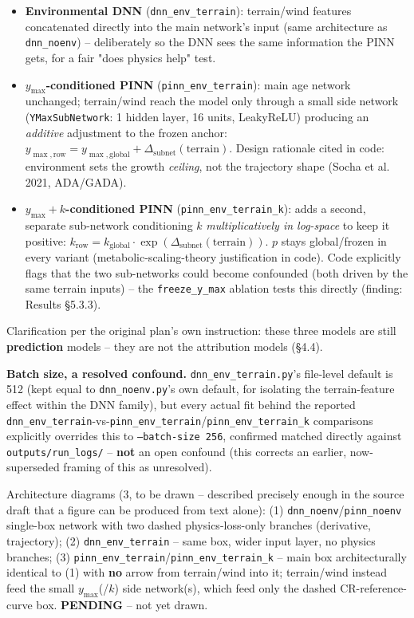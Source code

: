 \begin{itemize}
\setlength\itemsep{0pt}
\item \textbf{Environmental DNN} (\texttt{dnn\_env\_terrain}): terrain/wind features concatenated
directly into the main network's input (same architecture as \texttt{dnn\_noenv}) -- deliberately
so the DNN sees the same information the PINN gets, for a fair "does physics help" test.
\item \textbf{$y_{\max}$-conditioned PINN} (\texttt{pinn\_env\_terrain}): main age network
unchanged; terrain/wind reach the model only through a small side network (\texttt{YMaxSubNetwork}:
1 hidden layer, 16 units, LeakyReLU) producing an \emph{additive} adjustment to the frozen anchor:
$y_{\max,\text{row}} = y_{\max,\text{global}} + \Delta_{\text{subnet}}(\text{terrain})$. Design
rationale cited in code: environment sets the growth \emph{ceiling}, not the trajectory shape
(Socha et al. 2021, ADA/GADA).
\item \textbf{$y_{\max}+k$-conditioned PINN} (\texttt{pinn\_env\_terrain\_k}): adds a second,
separate sub-network conditioning $k$ \emph{multiplicatively in log-space} to keep it positive:
$k_{\text{row}} = k_{\text{global}}\cdot \exp(\Delta_{\text{subnet}}(\text{terrain}))$. $p$ stays
global/frozen in every variant (metabolic-scaling-theory justification in code). Code explicitly
flags that the two sub-networks could become confounded (both driven by the same terrain inputs)
-- the \texttt{freeze\_y\_max} ablation tests this directly (finding: Results \S5.3.3).
\end{itemize}

Clarification per the original plan's own instruction: these three models are still
\textbf{prediction} models -- they are not the attribution models (\S4.4).

\textbf{Batch size, a resolved confound.} \texttt{dnn\_env\_terrain.py}'s file-level default is
512 (kept equal to \texttt{dnn\_noenv.py}'s own default, for isolating the terrain-feature effect
within the DNN family), but every actual fit behind the reported
\texttt{dnn\_env\_terrain}-vs-\texttt{pinn\_env\_terrain}/\texttt{pinn\_env\_terrain\_k}
comparisons explicitly overrides this to \texttt{--batch-size 256}, confirmed matched directly
against \texttt{outputs/run\_logs/} -- \textbf{not} an open confound (this corrects an earlier,
now-superseded framing of this as unresolved).

Architecture diagrams (3, to be drawn -- described precisely enough in the source draft that a
figure can be produced from text alone): (1) \texttt{dnn\_noenv}/\texttt{pinn\_noenv} single-box
network with two dashed physics-loss-only branches (derivative, trajectory); (2)
\texttt{dnn\_env\_terrain} -- same box, wider input layer, no physics branches; (3)
\texttt{pinn\_env\_terrain}/\texttt{pinn\_env\_terrain\_k} -- main box architecturally identical to
(1) with \textbf{no} arrow from terrain/wind into it; terrain/wind instead feed the small
$y_{\max}$(/$k$) side network(s), which feed only the dashed CR-reference-curve box. \textbf{PENDING}
-- not yet drawn.

